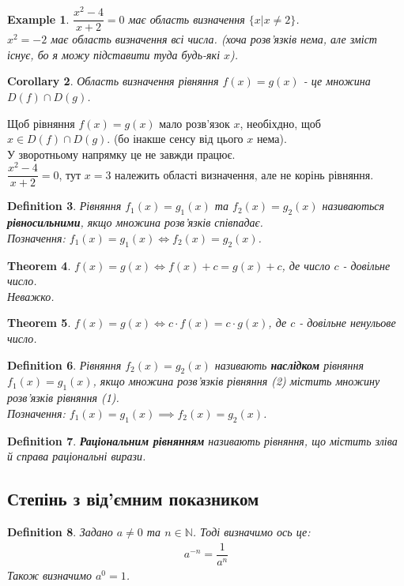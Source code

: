 \documentclass[a4paper, 10pt]{article}
\theoremstyle{theoremdd}
\newtheorem{theorem}{Theorem}[subsection]
\theoremstyle{theoremdd}
\newtheorem{definition}[theorem]{Definition}
\theoremstyle{theoremdd}
\theoremstyle{theoremdd}
\newtheorem{example}[theorem]{Example}
\theoremstyle{theoremdd}
\theoremstyle{theoremdd}
\theoremstyle{theoremdd}
\theoremstyle{theoremdd}
\newtheorem{corollary}[theorem]{Corollary}
\begin{document}
\begin{example}
$\dfrac{x^2-4}{x+2} = 0$ має область визначення $\{x | x \neq 2\}$.\\
$x^2 = -2$ має область визначення всі числа. (хоча розв'язків нема, але зміст існує, бо я можу підставити туда будь-які $x$).
\end{example}

\begin{corollary}
Область визначення рівняння $f(x) = g(x)$ - це множина $D(f) \cap D(g)$.
\end{corollary}

Щоб рівняння $f(x) = g(x)$ мало розв'язок $x$, необіхдно, щоб $x \in D(f) \cap D(g)$. (бо інакше сенсу від цього $x$ нема).\\
У зворотньому напрямку це не завжди працює.\\
$\dfrac{x^2-4}{x+2} = 0$, тут $x = 3$ належить області визначення, але не корінь рівняння.

\begin{definition}
Рівняння $f_1(x) = g_1(x)$ та $f_2(x) = g_2(x)$ називаються \textbf{рівносильними}, якщо множина розв'язків співпадає.\\
Позначення: $f_1(x) = g_1(x) \iff f_2(x) = g_2(x)$.
\end{definition}

\begin{theorem}
$f(x) = g(x) \iff f(x) + c = g(x) + c$, де число $c$ - довільне число.\\
\textit{Неважко.}
\end{theorem}

\begin{theorem}
$f(x) = g(x) \iff c \cdot f(x) = c \cdot g(x)$, де $c$ - довільне ненульове число.
\end{theorem}

\begin{definition}
Рівняння $f_2(x) = g_2(x)$ називають \textbf{наслідком} рівняння $f_1(x) = g_1(x)$, якщо множина розв'язків рівняння (2) містить множину розв'язків рівняння (1).\\
Позначення: $f_1(x) = g_1(x) \implies f_2(x) = g_2(x)$.
\end{definition}

\begin{definition}
\textbf{Раціональним рівнянням} називають рівняння, що містить зліва й справа раціональні вирази.
\end{definition}

\subsection{Степінь з від'ємним показником}
\begin{definition}
Задано $a \neq 0$ та $n \in \mathbb{N}$. Тоді визначимо ось це:
\begin{align*}
a^{-n} = \dfrac{1}{a^n}
\end{align*}
Також визначимо $a^0 = 1$.
\end{definition}
\end{document}

